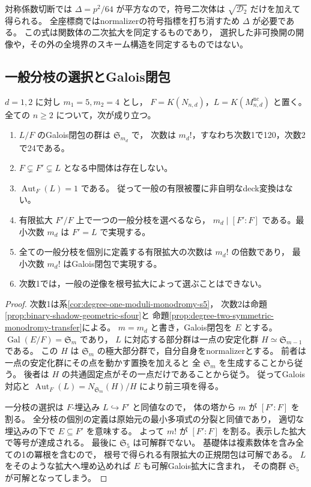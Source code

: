 \begin{remark}[判別式の使用範囲]
対称係数切断では $\Delta=p^2/64$ が平方なので，符号二次体は
$\sqrt{\mathscr D_2}$ だけを加えて得られる。
全座標商ではnormalizerの符号指標を打ち消すため $\Delta$ が必要である。
この式は関数体の二次拡大を同定するものであり，
選択した非可換開の開像や，その外の全境界のスキーム構造を同定するものではない。
\end{remark}

\subsection{一般分枝の選択とGalois閉包}

\begin{corollary}[一般分枝の選択とGalois閉包]
\label{cor:shadow-symmetric-field-consequences}
$d=1,2$ に対し $m_1=5,m_2=4$ とし，
$F=K(N_{n,d})$，$L=K(M^{\mathrm{nc}}_{n,d})$ と置く。
全ての $n\ge2$ について，次が成り立つ。
\begin{enumerate}
\item $L/F$ のGalois閉包の群は $\mathfrak S_{m_d}$ で，
      次数は $m_d!$，すなわち次数1で120，次数2で24である。
\item $F\subsetneq F'\subsetneq L$ となる中間体は存在しない。
\item $\operatorname{Aut}_F(L)=1$ である。
      従って一般の有限被覆に非自明なdeck変換はない。
\item 有限拡大 $F'/F$ 上で一つの一般分枝を選べるなら，
      $m_d\mid[F':F]$ である。最小次数 $m_d$ は $F'=L$ で実現する。
\item 全ての一般分枝を個別に定義する有限拡大の次数は $m_d!$ の倍数であり，
      最小次数 $m_d!$ はGalois閉包で実現する。
\item 次数1では，一般の逆像を根号拡大によって選ぶことはできない。
\end{enumerate}
\end{corollary}
\begin{proof}
次数1は系\ref{cor:degree-one-moduli-monodromy-s5}，
次数2は命題\ref{prop:binary-shadow-geometric-sfour}と
命題\ref{prop:degree-two-symmetric-monodromy-transfer}による。
$m=m_d$ と書き，Galois閉包を $E$ とする。
$\operatorname{Gal}(E/F)=\mathfrak S_m$ であり，
$L$ に対応する部分群は一点の安定化群 $H\simeq\mathfrak S_{m-1}$ である。
この $H$ は $\mathfrak S_m$ の極大部分群で，自分自身をnormalizerとする。
前者は一点の安定化群にその点を動かす置換を加えると
全 $\mathfrak S_m$ を生成することから従う。
後者は $H$ の共通固定点がその一点だけであることから従う。
従ってGalois対応と
$\operatorname{Aut}_F(L)=N_{\mathfrak S_m}(H)/H$ により前三項を得る。

一分枝の選択は $F$-埋込み $L\hookrightarrow F'$ と同値なので，
体の塔から $m$ が $[F':F]$ を割る。
全分枝の個別の定義は原始元の最小多項式の分裂と同値であり，
適切な埋込みの下で $E\subseteq F'$ を意味する。
よって $m!$ が $[F':F]$ を割る。表示した拡大で等号が達成される。
最後に $\mathfrak S_5$ は可解群でない。
基礎体は複素数体を含み全ての1の冪根を含むので，
根号で得られる有限拡大の正規閉包は可解である。
$L$ をそのような拡大へ埋め込めれば $E$ も可解Galois拡大に含まれ，
その商群 $\mathfrak S_5$ が可解となってしまう。
\end{proof}
